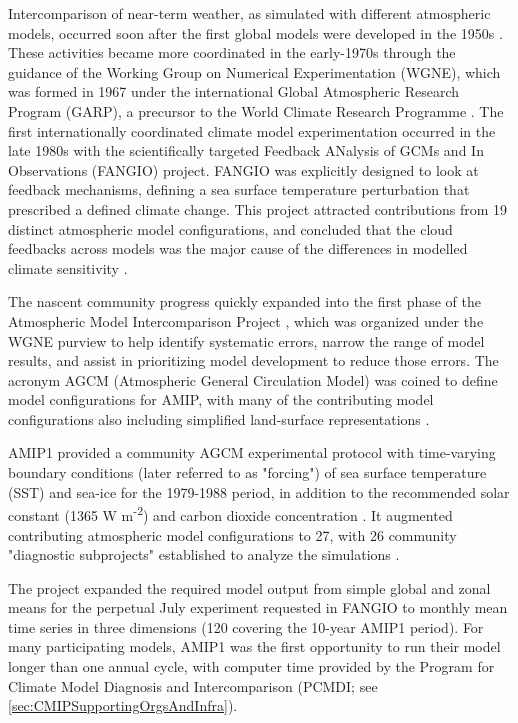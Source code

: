 \documentclass[manuscript]{copernicus}
\begin{document}
Intercomparison of near-term weather, as simulated with different atmospheric models, occurred soon after the first global models were developed in the 1950s \citep[e.g.,][]{gates_ams_1992,edwards_history_2011}. These activities became more coordinated in the early-1970s through the guidance of the Working Group on Numerical Experimentation (WGNE), which was formed in 1967 under the international Global Atmospheric Research Program (GARP), a precursor to the World Climate Research Programme \citep[WCRP;][]{gates_ams_1992}. The first internationally coordinated climate model experimentation occurred in the late 1980s with the scientifically targeted Feedback ANalysis of GCMs and In Observations (FANGIO) project. FANGIO was explicitly designed to look at feedback mechanisms, defining a sea surface temperature perturbation that prescribed a defined climate change. This project attracted contributions from 19 distinct atmospheric model configurations, and concluded that the cloud feedbacks across models was the major cause of the differences in modelled climate sensitivity \citep{cess_methodology_1988, cess_interpretation_1989, cess_intercomparison_1990, cess_first_1991}.

The nascent community progress quickly expanded into the first phase of the Atmospheric Model Intercomparison Project \citep[AMIP, hereafter referred to as AMIP1;][]{gates_amip_1992}, which was organized under the WGNE purview to help identify systematic errors, narrow the range of model results, and assist in prioritizing model development to reduce those errors. The acronym AGCM (Atmospheric General Circulation Model) was coined to define model configurations for AMIP, with many of the contributing model configurations also including simplified land-surface representations \citep[e.g.,][]{budyko_heat_1961,manabe_climate_1969,vargas_godoy_global_2021}.

AMIP1 provided a community AGCM experimental protocol with time-varying boundary conditions (later referred to as "forcing") of sea surface temperature (SST) and sea-ice for the 1979-1988 period, in addition to the recommended solar constant (1365 W m\textsuperscript{-2}) and carbon dioxide concentration \citep[345 ppm;][]{gates_amip_1991}. It augmented contributing atmospheric model configurations to 27, with 26 community "diagnostic subprojects" established to analyze the simulations \citep{gates_amip_1995}.

The project expanded the required model output from simple global and zonal means for the perpetual July experiment requested in FANGIO to monthly mean time series in three dimensions (120 covering the 10-year AMIP1 period). For many participating models, AMIP1 was the first opportunity to run their model longer than one annual cycle, with computer time provided by the Program for Climate Model Diagnosis and Intercomparison (PCMDI; see \autoref{sec:CMIPSupportingOrgsAndInfra}).
\end{document}
